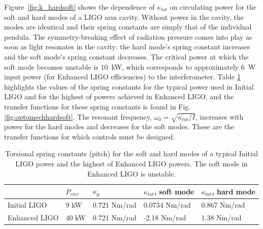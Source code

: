 Figure~\ref{fig:k_hardsoft} shows the dependence of $\kappa_{tot}$ on
circulating power for the soft and hard modes of a LIGO arm
cavity. Without power in the cavity, the modes are identical and their
spring constants are simply that of the individual pendula. The
symmetry-breaking effect of radiation pressure comes into play as soon
as light resonates in the cavity: the hard mode's spring constant
increases and the soft mode's spring constant decreases. The critical
power at which the soft mode becomes unstable is 10~kW, which
corresponds to approximately 6~W input power (for Enhanced LIGO
efficiencies) to the interferometer.  Table \ref{table:k_tot}
highlights the values of the spring constants for the typical power
used in Initial LIGO and for the highest of powers achieved in
Enhanced LIGO, and the transfer functions for these spring constants
is found in Fig. \ref{fig:optomechhardsoft}. The resonant frequency,
$\omega_0 = \sqrt{\kappa_{tot}/I}$, increases with power for the hard
modes and decreases for the soft modes. These are the transfer
functions for which controls must be designed.


\begin{table}
\centering
\caption{Torsional spring constants (pitch) for the soft and hard modes of a typical
  Initial LIGO power and the highest of Enhanced LIGO powers. The soft
mode in Enhanced LIGO is unstable.}
\begin{tabular}{l l l l l}
 & $P_{circ}$ & $\kappa_{p}$ & $\kappa_{tot}$, soft mode &
 $\kappa_{tot}$, hard mode\\
\hline\hline
Initial LIGO & 9 kW & 0.721 Nm/rad& 0.0734 Nm/rad & 0.867 Nm/rad\\
Enhanced LIGO & 40 kW & 0.721 Nm/rad& -2.18 Nm/rad & 1.38 Nm/rad\\
\hline
\end{tabular}
\label{table:k_tot}
\end{table}



